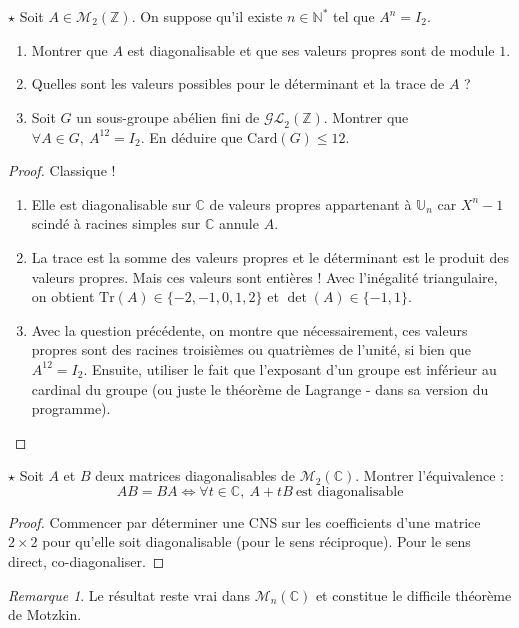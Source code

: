 \documentclass[french,a4paper]{article}
\newcommand{\N}{\mathbb{N}}
\newcommand{\Z}{\mathbb{Z}}
\newcommand{\C}{\mathbb{C}}
\newcommand{\U}{\mathbb{U}}
\newcommand{\st}{^*}
\newcommand{\card}{\text{Card}}
\newcommand{\Tr}{\text{Tr}}
\theoremstyle{plain}
\theoremstyle{definition}
\theoremstyle{remark}
\newtheorem*{rmq}{Remarque}
\begin{document}
\begin{ex}[Châteaux]{$\star$}
	Soit $A\in\mathcal{M}_2(\Z)$. On suppose qu'il existe $n\in\N\st$ tel que $A^n=I_2$.
	\begin{enumerate}
		\item Montrer que $A$ est diagonalisable et que ses valeurs propres sont de module $1$.
		\item Quelles sont les valeurs possibles pour le déterminant et la trace de $A$ ?
		\item Soit $G$ un sous-groupe abélien fini de $\mathcal{GL}_2(\Z)$. Montrer que $\forall A\in G,\  A^{12}=I_2$. En déduire que $\card(G)\leqslant 12$.
	\end{enumerate}
\end{ex}
\begin{proof}
	Classique !
	\begin{enumerate}
		\item Elle est diagonalisable sur $\C$ de valeurs propres appartenant à $\U_n$ car $X^n-1$ scindé à racines simples sur $\C$ annule $A$.
		\item La trace est la somme des valeurs propres et le déterminant est le produit des valeurs propres. Mais ces valeurs sont entières ! Avec l'inégalité triangulaire, on obtient $\Tr(A)\in\{-2,-1,0,1,2\}$ et $\det(A)\in\{-1,1\}$.
		\item Avec la question précédente, on montre que nécessairement, ces valeurs propres sont des racines troisièmes ou quatrièmes de l'unité, si bien que $A^{12}=I_2$. Ensuite, utiliser le fait que l'exposant d'un groupe est inférieur au cardinal du groupe (ou juste le théorème de Lagrange - dans sa version du programme).
	\end{enumerate}
\end{proof}

\begin{ex}[Châteaux]{$\star$}
	Soit $A$ et $B$ deux matrices diagonalisables de $\mathcal{M}_2(\C)$. Montrer l'équivalence : $$AB=BA\iff \forall t\in\C,\ A+tB\ \text{est diagonalisable}$$
\end{ex}
\begin{proof}
	Commencer par déterminer une CNS sur les coefficients d'une matrice $2\times 2$ pour qu'elle soit diagonalisable (pour le sens réciproque). Pour le sens direct, co-diagonaliser.
\end{proof}
\begin{rmq}
	Le résultat reste vrai dans $\mathcal{M}_n(\C)$ et constitue le difficile théorème de Motzkin.
\end{rmq}
\end{document}
